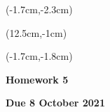\documentclass[12pt, oneside]{article}
\begin{document}
\begin{textblock*}{4cm}(-1.7cm,-2.3cm)
\end{textblock*}

\begin{textblock*}{8cm}(12.5cm,-1cm)
\end{textblock*}
\begin{textblock*}{13.5cm}(-1.7cm,-1.8cm)
\end{textblock*}

\vspace{1cm}

\begin{center}
\textbf{\Large Homework 5}

\textbf{Due 8 October 2021}
\end{center}
\end{document}
